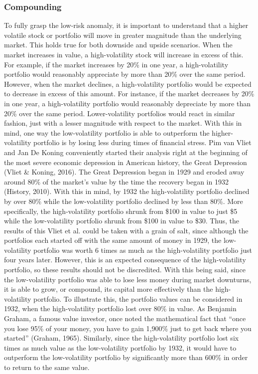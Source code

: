 \documentclass[12pt,twoside]{reedthesis}
\theoremstyle{definition}
\theoremstyle{definition}
\theoremstyle{definition}
\theoremstyle{remark}
\begin{document}
\subsubsection{Compounding}\label{compounding}

To fully grasp the low-risk anomaly, it is important to understand that
a higher volatile stock or portfolio will move in greater magnitude than
the underlying market. This holds true for both downside and upside
scenarios. When the market increases in value, a high-volatility stock
will increase in excess of this. For example, if the market increases by
20\% in one year, a high-volatility portfolio would reasonably
appreciate by more than 20\% over the same period. However, when the
market declines, a high-volatility portfolio would be expected to
decrease in excess of this amount. For instance, if the market decreases
by 20\% in one year, a high-volatility portfolio would reasonably
depreciate by more than 20\% over the same period. Lower-volatility
portfolios would react in similar fashion, just with a lesser magnitude
with respect to the market. With this in mind, one way the
low-volatility portfolio is able to outperform the higher-volatility
portfolio is by losing less during times of financial stress. Pim van
Vliet and Jan De Koning conveniently started their analysis right at the
beginning of the most severe economic depression in American history,
the Great Depression (Vliet \& Koning, 2016). The Great Depression began
in 1929 and eroded away around 80\% of the market's value by the time
the recovery began in 1932 (History, 2010). With this in mind, by 1932
the high-volatility portfolio declined by over 80\% while the
low-volatility portfolio declined by less than 80\%. More specifically,
the high-volatility portfolio shrunk from \$100 in value to just \$5
while the low-volatility portfolio shrunk from \$100 in value to \$30.
Thus, the results of this Vliet et al. could be taken with a grain of
salt, since although the portfolios each started off with the same
amount of money in 1929, the low-volatility portfolio was worth 6 times
as much as the high-volatility portfolio just four years later. However,
this is an expected consequence of the high-volatility portfolio, so
these results should not be discredited. With this being said, since the
low-volatility portfolio was able to lose less money during market
downturns, it is able to grow, or compound, its capital more effectively
than the high-volatility portfolio. To illustrate this, the portfolio
values can be considered in 1932, when the high-volatility portfolio
lost over 80\% in value. As Benjamin Graham, a famous value investor,
once noted the mathematical fact that ``once you lose 95\% of your
money, you have to gain 1,900\% just to get back where you started''
(Graham, 1965). Similarly, since the high-volatility portfolio lost six
times as much value as the low-volatility portfolio by 1932, it would
have to outperform the low-volatility portfolio by significantly more
than 600\% in order to return to the same value.
\end{document}
